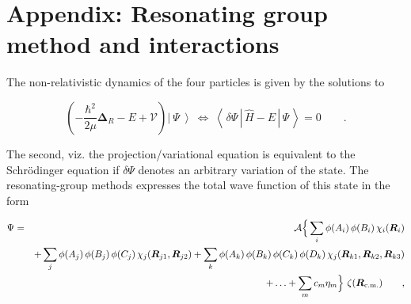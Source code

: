 \documentclass[aps,onecolumn,preprintnumbers,amsmath,amssymb,nofootinbib,superscriptaddress,notitlepage]{revtex4-1}
\newcommand{\ve}[1]{\ensuremath{\boldsymbol{#1}}}
\newcommand{\rcm}{\ensuremath{\ve{R}_\text{\scriptsize{c.m.}}}}
\newcommand{\ket}[1] {\left|~#1~\right\rangle}
\newcommand{\me}[3] {\left\langle\,#1\,\left.\left|\,#2\,\right|\right.\,#3\,\right\rangle}
\begin{document}
\section{Appendix: Resonating group method and interactions}


%
%
%

The non-relativistic dynamics of the four particles is given by the solutions to

\begin{equation}\label{eq.rgm.eqom}
\left(-\frac{\hbar^2}{2\mu}\ve{\Delta}_R-E+\mathcal{V}\right)\ket{\Psi}
~
\Leftrightarrow
~
\me{\delta\Psi}{\hat{H}-E}{\Psi}
=
0
\qquad.
\end{equation}

The second, viz. the projection/variational equation is equivalent to the Schr\"odinger equation if
$\delta\Psi$ denotes an arbitrary variation of the state.
The resonating-group methods expresses the total wave function of this state in the form

\begin{eqnarray}\label{eq.app.rgmwfkt}
\Psi
&=&
\mathcal{A}\Big\lbrace
\sum_i\phi(A_i)\,\phi(B_i)\,\chi_i(\ve{R}_i)
\nonumber\\
&&
+\sum_j\phi(A_j)\,\phi(B_j)\,\phi(C_j)\,\chi_j(\ve{R}_{j1},\ve{R}_{j2})
+\sum_k\phi(A_k)\,\phi(B_k)\,\phi(C_k)\,\phi(D_k)\,\chi_j(\ve{R}_{k1},\ve{R}_{k2},\ve{R}_{k3})
\nonumber\\
&&
+\ldots+\sum_mc_m\eta_m
\Big\rbrace~
\zeta(\rcm)
\qquad,
\end{eqnarray}
\end{document}
